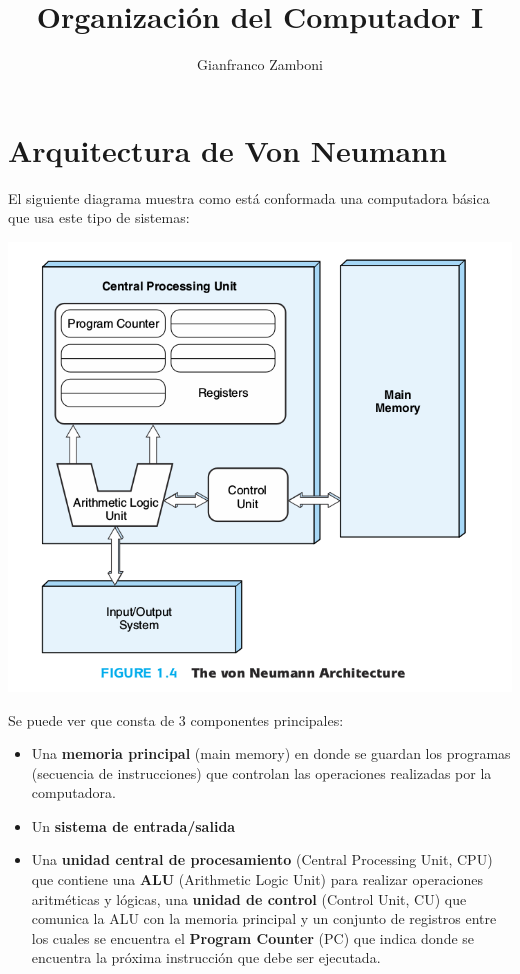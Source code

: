 

\title{Organización del Computador I}
\author{Gianfranco Zamboni}



\newcommand{\red}[1]{{\color{red}#1}}  			%

	\maketitle
	\tableofcontents
	\newpage

\section{Arquitectura de Von Neumann}
El siguiente diagrama muestra como está conformada una computadora básica que usa este tipo de sistemas:

\includegraphics[width=15cm, keepaspectratio=yes]{imagenes/von_neumann.png}

Se puede ver que consta de 3 componentes principales:
\begin{itemize}
	\item Una \textbf{memoria principal} (main memory) en donde se guardan los programas (secuencia de instrucciones) que controlan las operaciones realizadas por la computadora.
	\item Un \textbf{sistema de entrada/salida}
	\item Una \textbf{unidad central de procesamiento} (Central Processing Unit, CPU) que contiene una \textbf{ALU} (Arithmetic Logic Unit) para realizar operaciones aritméticas y lógicas, una \textbf{unidad de control} (Control Unit, CU) que comunica la ALU con la memoria principal y un conjunto de registros entre los cuales se encuentra el \textbf{Program Counter} (PC) que indica donde se encuentra la próxima instrucción que debe ser ejecutada.
\end{itemize}


